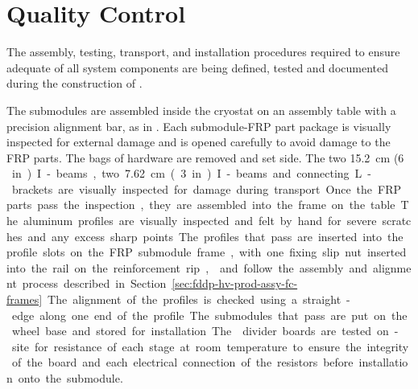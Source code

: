 \section{Quality Control}
\label{sec:fddp-hv-qc}

The assembly, testing, transport, and installation procedures required to ensure adequate  of all  system components are being defined, tested and documented during the construction of .

The  submodules are assembled inside the cryostat on an assembly table with a precision alignment bar, as in .  %
Each submodule-FRP part package is visually inspected for external damage and is opened carefully to avoid damage to the FRP parts.  
The bags of hardware are removed and set side.   The two \SI{15.2}{\cm} (\SI{6}\,in) I-beams, two \SI{7.62}{cm} (\SI{3}{in}) I-beams and connecting L-brackets are visually inspected for  damage during transport.  Once the FRP parts pass the inspection, they are assembled into the frame on the table.  


The aluminum profiles are visually inspected and felt by hand for severe scratches and any excess sharp points.  The profiles that pass are inserted into the profile slots on the FRP submodule frame, with one fixing slip nut inserted into the rail on the reinforcement rip, 
 and follow the assembly and alignment process described in Section~\ref{sec:fddp-hv-prod-assy-fc-frames}.  The alignment of the profiles is checked using a straight-edge along one end of the profile.  The submodules that pass are put on the wheel base and stored for installation.

The  divider boards are tested on-site for resistance of each stage at room temperature to ensure the integrity of the board and each electrical connection of the resistors before installation onto the submodule. 


